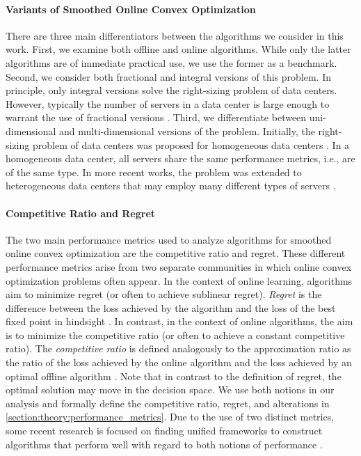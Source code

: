 \paragraph{Variants of Smoothed Online Convex Optimization} There are three main differentiators between the algorithms we consider in this work. First, we examine both offline and online algorithms. While only the latter algorithms are of immediate practical use, we use the former as a benchmark. Second, we consider both fractional and integral versions of this problem. In principle, only integral versions solve the right-sizing problem of data centers. However, typically the number of servers in a data center is large enough to warrant the use of fractional versions \cite{Bansal2015}. Third, we differentiate between uni-dimensional and multi-dimensional versions of the problem. Initially, the right-sizing problem of data centers was proposed for homogeneous data centers \cite{Lin2011, Bansal2015, Albers2018}. In a homogeneous data center, all servers share the same performance metrics, i.e., are of the same type. In more recent works, the problem was extended to heterogeneous data centers that may employ many different types of servers \cite{Lin2012, Chen2018, Goel2019, Albers2021, Albers2021_2}.

\paragraph{Competitive Ratio and Regret} The two main performance metrics used to analyze algorithms for smoothed online convex optimization are the competitive ratio and regret. These different performance metrics arise from two separate communities in which online convex optimization problems often appear. In the context of online learning, algorithms aim to minimize regret (or often to achieve sublinear regret). \emph{Regret} is the difference between the loss achieved by the algorithm and the loss of the best fixed point in hindsight \cite{Chen2018}. In contrast, in the context of online algorithms, the aim is to minimize the competitive ratio (or often to achieve a constant competitive ratio). The \emph{competitive ratio} is defined analogously to the approximation ratio as the ratio of the loss achieved by the online algorithm and the loss achieved by an optimal offline algorithm \cite{Chen2018}. Note that in contrast to the definition of regret, the optimal solution may move in the decision space. We use both notions in our analysis and formally define the competitive ratio, regret, and alterations in \autoref{section:theory:performance_metrics}. Due to the use of two distinct metrics, some recent research is focused on finding unified frameworks to construct algorithms that perform well with regard to both notions of performance \cite{Chen2018, Goel2019}.

